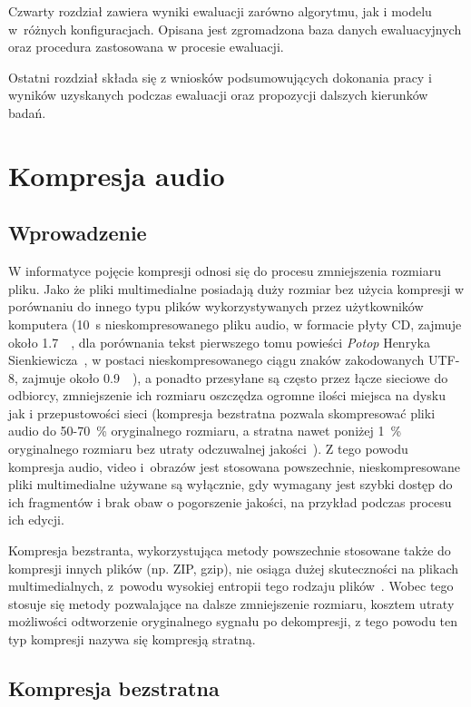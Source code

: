 \documentclass[pl,12pt]{aghdpl}
\let\Oldchapter\chapter%
\renewcommand{\chapter}{\FloatBarrier\Oldchapter}
\let\Oldsection\section%
\renewcommand{\section}{\FloatBarrier\Oldsection}
\begin{document}
Czwarty rozdział zawiera wyniki ewaluacji zarówno algorytmu, jak i modelu
w~różnych konfiguracjach. Opisana jest zgromadzona baza danych ewaluacyjnych oraz
procedura zastosowana w procesie ewaluacji.

Ostatni rozdział składa się z wniosków podsumowujących dokonania pracy i
wyników uzyskanych podczas ewaluacji oraz propozycji dalszych kierunków badań.

\chapter{Kompresja audio}
\section{Wprowadzenie}
W informatyce pojęcie kompresji odnosi się do procesu zmniejszenia rozmiaru
pliku. Jako że pliki multimedialne posiadają duży rozmiar bez użycia kompresji
w porównaniu do innego typu plików wykorzystywanych przez użytkowników
komputera (\SI{10}{\second} nieskompresowanego pliku audio, w formacie płyty
CD, zajmuje około \SI{1.7}{\mebi\byte}, dla porównania tekst pierwszego tomu
powieści \textit{Potop} Henryka Sienkiewicza~\cite{Sienkiewicz2010}, w postaci
nieskompresowanego ciągu znaków zakodowanych UTF-8, zajmuje około
\SI{0.9}{\mebi\byte}), a ponadto przesyłane są często przez łącze sieciowe do
odbiorcy, zmniejszenie ich rozmiaru oszczędza ogromne ilości miejsca na dysku
jak i przepustowości sieci (kompresja bezstratna pozwala skompresować pliki
audio do \num{50}-\SI{70}{\percent} oryginalnego rozmiaru, a stratna nawet
poniżej \SI{1}{\percent} oryginalnego rozmiaru bez utraty odczuwalnej
jakości~\cite{Beurden2015, kamedo22014}). Z tego powodu kompresja audio, video
i~obrazów jest stosowana powszechnie, nieskompresowane pliki multimedialne
używane są wyłącznie, gdy wymagany jest szybki dostęp do ich fragmentów i brak
obaw o pogorszenie jakości, na przykład podczas procesu ich edycji.

Kompresja bezstranta, wykorzystująca metody powszechnie stosowane także do
kompresji innych plików (np. ZIP, gzip), nie osiąga dużej skuteczności na
plikach multimedialnych, z~powodu wysokiej entropii tego rodzaju
plików~\cite{Sayood2002}. Wobec tego stosuje się metody pozwalające na dalsze
zmniejszenie rozmiaru, kosztem utraty możliwości odtworzenie oryginalnego
sygnału po dekompresji, z tego powodu ten typ kompresji nazywa się kompresją
stratną.

\section{Kompresja bezstratna}
\end{document}
